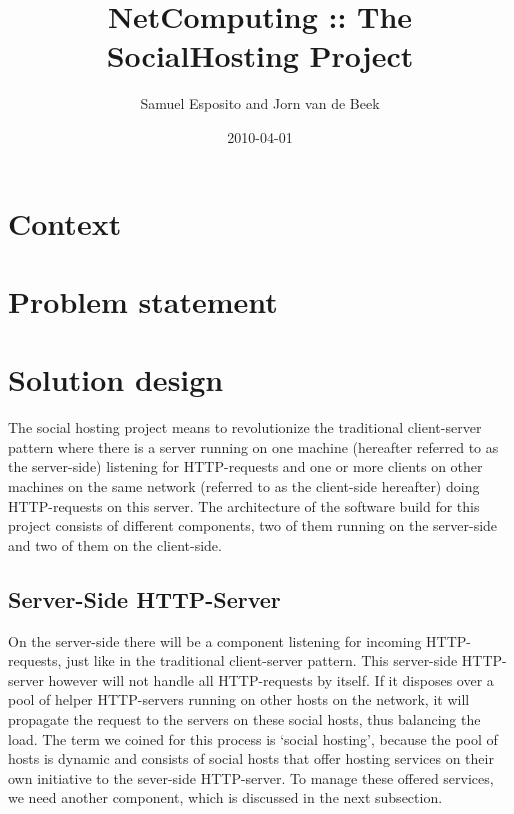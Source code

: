 \documentclass[a4paper, 10pt]{article}
\title{NetComputing :: The SocialHosting Project}
\author{Samuel Esposito and Jorn van de Beek}
\date{2010-04-01}
\begin{document}
\ifpdf
{}
\else
{}
\fi

\maketitle

\section{Context}

\section{Problem statement}

\section{Solution design}

The social hosting project means to revolutionize the traditional client-server pattern where there is a server running on one machine (hereafter referred to as the server-side) listening for HTTP-requests and one or more clients on other machines on the same network (referred to as the client-side hereafter) doing HTTP-requests on this server. The architecture of the software build for this project consists of different components, two of them running on the server-side and two of them on the client-side. 

\subsection{Server-Side HTTP-Server}
On the server-side there will be a component listening for incoming HTTP-requests, just like in the traditional client-server pattern. This server-side HTTP-server however will not handle all HTTP-requests by itself. If it disposes over a pool of helper HTTP-servers running on other hosts on the network, it will propagate the request to the servers on these social hosts, thus balancing the load. The term we coined for this process is `social hosting', because the pool of hosts is dynamic and consists of social hosts that offer hosting services on their own initiative to the sever-side HTTP-server. To manage these offered services, we need another component, which is discussed in the next subsection.
\end{document}
